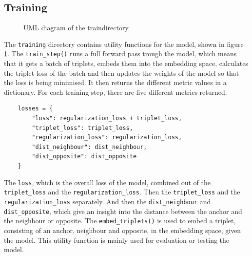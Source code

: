\subsection{Training}
\label{sub:Component-Training}
\begin{figure}[htbp]
	\centering
	\caption{UML diagram of the \flqq train\frqq directory}
	\label{fig:UML-Train}
\end{figure}
\noindent
The \texttt{training} directory contains utility functions for the model, shown in figure \ref{fig:UML-Train}. The \texttt{train\_step()} runs a full forward pass trough the model, which means that it gets a batch of triplets, embeds them into the embedding space, calculates the triplet loss of the batch and then updates the weights of the model so that the loss is being minimised. It then returns the different metric values in a dictionary. For each training step, there are five different metrics returned. 
\begin{verbatim}
    losses = {
        "loss": regularization_loss + triplet_loss,
        "triplet_loss": triplet_loss,
        "regularization_loss": regularization_loss,
        "dist_neighbour": dist_neighbour,
        "dist_opposite": dist_opposite
    }
\end{verbatim}
The \texttt{loss}, which is the overall loss of the model, combined out of the \texttt{triplet\_loss} and the \texttt{regularization\_loss}. Then the \texttt{triplet\_loss} and the \texttt{regularization\_loss} separately. And then the \texttt{dist\_neighbour} and \texttt{dist\_opposite}, which give an insight into the distance between the anchor and the neighbour or opposite.
\newline
\newline
The \texttt{embed\_triplets()} is used to embed a triplet, consisting of an anchor, neighbour and opposite, in the embedding space, given the model. This utility function is mainly used for evaluation or testing the model.

